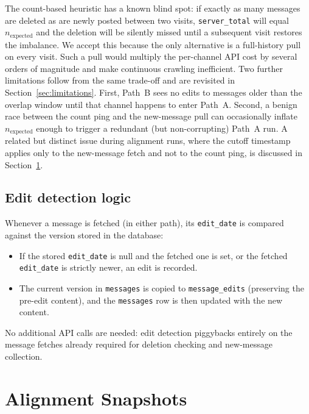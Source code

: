 The count-based heuristic has a known blind spot: if exactly as many messages are deleted as are newly posted between two visits, \texttt{server\_total} will equal $n_{\mathrm{expected}}$ and the deletion will be silently missed until a subsequent visit restores the imbalance. We accept this because the only alternative is a full-history pull on every visit. Such a pull would multiply the per-channel API cost by several orders of magnitude and make continuous crawling inefficient. Two further limitations follow from the same trade-off and are revisited in Section~\ref{sec:limitations}. First, Path~B sees no edits to messages older than the overlap window until that channel happens to enter Path~A. Second, a benign race between the count ping and the new-message pull can occasionally inflate $n_{\mathrm{expected}}$ enough to trigger a redundant (but non-corrupting) Path~A run. A related but distinct issue during alignment runs, where the cutoff timestamp applies only to the new-message fetch and not to the count ping, is discussed in Section~\ref{sec:alignment}.

\subsection{Edit detection logic}

Whenever a message is fetched (in either path), its \texttt{edit\_date} is compared against the version stored in the database:
\begin{itemize}
    \item If the stored \texttt{edit\_date} is null and the fetched one is set, or the fetched \texttt{edit\_date} is strictly newer, an edit is recorded.
    \item The current version in \texttt{messages} is copied to \texttt{message\_edits} (preserving the pre-edit content), and the \texttt{messages} row is then updated with the new content.
\end{itemize}
No additional API calls are needed: edit detection piggybacks entirely on the message fetches already required for deletion checking and new-message collection.

\section{Alignment Snapshots}
\label{sec:alignment}

